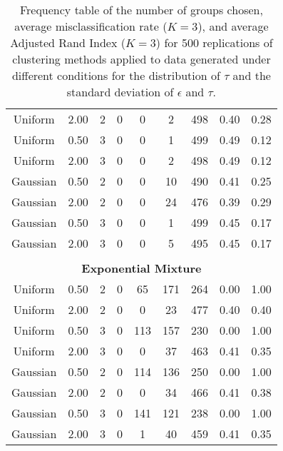 \begin{table}[ht]
\begin{center}
\begin{tabular}{ccc|cccccc}
  Uniform & 2.00 &   2 &   0 &   0 &   2 & 498 & 0.40 & 0.28 \\ 
  Uniform & 0.50 &   3 &   0 &   0 &   1 & 499 & 0.49 & 0.12 \\ 
  Uniform & 2.00 &   3 &   0 &   0 &   2 & 498 & 0.49 & 0.12 \\ 
  Gaussian & 0.50 &   2 &   0 &   0 &  10 & 490 & 0.41 & 0.25 \\ 
  Gaussian & 2.00 &   2 &   0 &   0 &  24 & 476 & 0.39 & 0.29 \\ 
  Gaussian & 0.50 &   3 &   0 &   0 &   1 & 499 & 0.45 & 0.17 \\ 
  Gaussian & 2.00 &   3 &   0 &   0 &   5 & 495 & 0.45 & 0.17 \\ 
   \\ \multicolumn{9}{c}{\textbf{Exponential Mixture}}\\Uniform & 0.50 &   2 &   0 &  65 & 171 & 264 & 0.00 & 1.00 \\ 
  Uniform & 2.00 &   2 &   0 &   0 &  23 & 477 & 0.40 & 0.40 \\ 
  Uniform & 0.50 &   3 &   0 & 113 & 157 & 230 & 0.00 & 1.00 \\ 
  Uniform & 2.00 &   3 &   0 &   0 &  37 & 463 & 0.41 & 0.35 \\ 
  Gaussian & 0.50 &   2 &   0 & 114 & 136 & 250 & 0.00 & 1.00 \\ 
  Gaussian & 2.00 &   2 &   0 &   0 &  34 & 466 & 0.41 & 0.38 \\ 
  Gaussian & 0.50 &   3 &   0 & 141 & 121 & 238 & 0.00 & 1.00 \\ 
  Gaussian & 2.00 &   3 &   0 &   1 &  40 & 459 & 0.41 & 0.35 \\ 
   \hline\end{tabular}
\caption{Frequency table of the number of groups chosen, average misclassification rate ($K=3$), and average Adjusted Rand Index ($K=3$) for 500 replications of clustering methods applied to data generated under different conditions for the distribution of $\tau$ and the standard deviation of $\epsilon$ and $\tau$.}
\label{tab:freq1}
\end{center}
\end{table}

